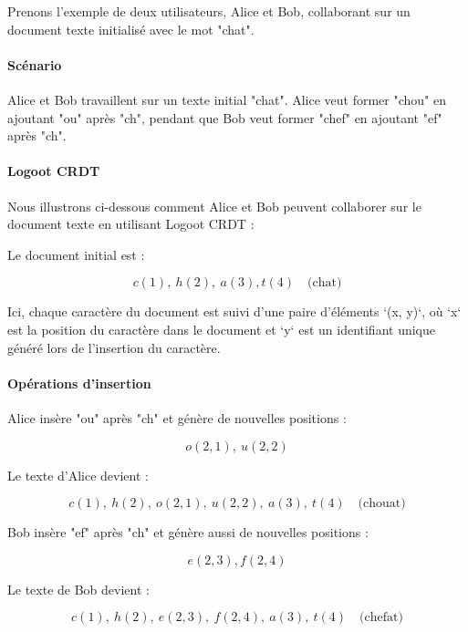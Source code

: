 Prenons l'exemple de deux utilisateurs, Alice et Bob, collaborant sur un document texte initialisé avec le mot "chat".

\paragraph{Scénario}
Alice et Bob travaillent sur un texte initial "chat". Alice veut former "chou" en ajoutant "ou" après "ch", pendant que Bob veut former "chef" en ajoutant "ef" après "ch".

\paragraph{Logoot \Gls{CRDT}}
Nous illustrons ci-dessous comment Alice et Bob peuvent collaborer sur le document texte en utilisant Logoot \Gls{CRDT} :

Le document initial est :

\begin{equation}
    c(1),\ h(2), \ a(3), t(4) \quad \text{(chat)}
\end{equation}

Ici, chaque caractère du document est suivi d'une paire d'éléments `(x, y)`, où `x` est la position du caractère dans le document et `y` est un identifiant unique généré lors de l'insertion du caractère.

\paragraph{Opérations d'insertion}
Alice insère "ou" après "ch" et génère de nouvelles positions :

\begin{equation}
    o(2, 1), \ u(2, 2)
\end{equation}

Le texte d'Alice devient :

\begin{equation}
    c(1), \ h(2), \ o(2, 1), \ u(2, 2), \ a(3), \ t(4) \quad \text{(chouat)}
\end{equation}

Bob insère "ef" après "ch" et génère aussi de nouvelles positions :

\begin{equation}
    e(2, 3), f(2, 4)
\end{equation}

Le texte de Bob devient :

\begin{equation}
    c(1), \ h(2), \ e(2, 3), \ f(2, 4), \ a(3), \ t(4) \quad \text{(chefat)}
\end{equation}

